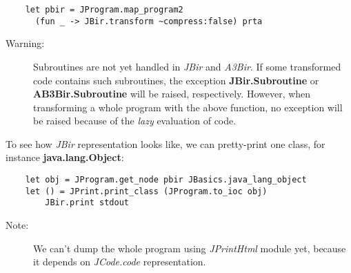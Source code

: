\documentclass{article}
\begin{document}
\begin{verbatim}
    let pbir = JProgram.map_program2
      (fun _ -> JBir.transform ~compress:false) prta
\end{verbatim}
\begin{description}
\item[Warning:]
Subroutines are not yet handled in \emph{JBir} and \emph{A3Bir}. If
some transformed code contains such subroutines, the exception
\textbf{JBir.Subroutine} or \textbf{AB3Bir.Subroutine} will be
raised, respectively. However, when transforming a whole program
with the above function, no exception will be raised because of the
\emph{lazy} evaluation of code.
\end{description}
To see how \emph{JBir} representation looks like, we can
pretty-print one class, for instance \textbf{java.lang.Object}:

\begin{verbatim}
    let obj = JProgram.get_node pbir JBasics.java_lang_object
    let () = JPrint.print_class (JProgram.to_ioc obj)
        JBir.print stdout
\end{verbatim}
\begin{description}
\item[Note:]
We can't dump the whole program using \emph{JPrintHtml} module yet,
because it depends on \emph{JCode.code} representation.
\end{description}
\end{document}
